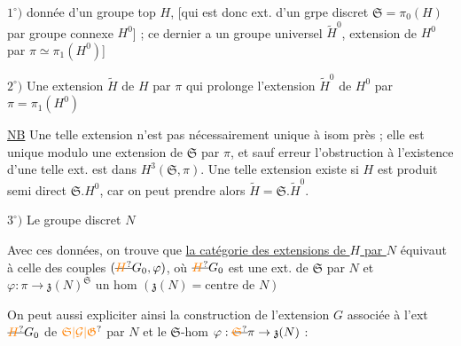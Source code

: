 \(1^\circ)\) donnée d'un groupe top \(H\),  [qui est donc ext. d'un grpe discret \(\mathfrak{S}=\pi_0(H)\) par  groupe connexe \(H^0\)] ; ce dernier  a un groupe  universel \(\widetilde H^0\), extension de \(H^0\) par \(\pi\simeq\pi_1(H^0)\)]

\(2^\circ)\) Une extension \(\widetilde H\) de \(H\) par \(\pi\) qui prolonge l'extension \(\widetilde H^0\) de \(H^0\) par \(\pi=\pi_1(H^0)\)

\uline{NB} Une telle extension n'est pas nécessairement unique à isom près ; elle est unique modulo une extension de \(\mathfrak{S}\) par \(\pi\),  et sauf erreur l'obstruction à l'existence d'une telle ext. est dans \(H^3(\mathfrak{S},\pi)\). Une telle extension existe si \(H\) est produit semi direct \(\mathfrak{S}.H^0\), car on peut prendre alors \(\widetilde H=\mathfrak{S}.\widetilde H^0\).


\(3^\circ)\) Le groupe discret \(N\)

Avec ces données, on trouve que \uline{la catégorie des extensions de \(H\) par \(N\)} équivaut à celle des couples \((\deleted{\unsure{H}}G_0,\varphi)\), où \(\deleted{\unsure{H}}G_0\) est une ext. de \(\mathfrak{S}\) par \(N\) et \(\varphi:\pi\longrightarrow\mathfrak{z}(N)^{\mathfrak{S}}\) un hom \((\mathfrak{z}(N)=\text{centre de }N)\)

On peut aussi expliciter ainsi la construction de l'extension \(G\)  associée à l'ext \(\deleted{\unsure{H}}G_0\) de \(\unsure{\mathfrak{S}|\mathcal{G}|\mathfrak{G}}\) par \(N\) et le \(\mathfrak{S}\)-hom \(\varphi:\deleted{\unsure{\mathfrak{S}}}\pi\to\mathfrak{z}(N)\) :

